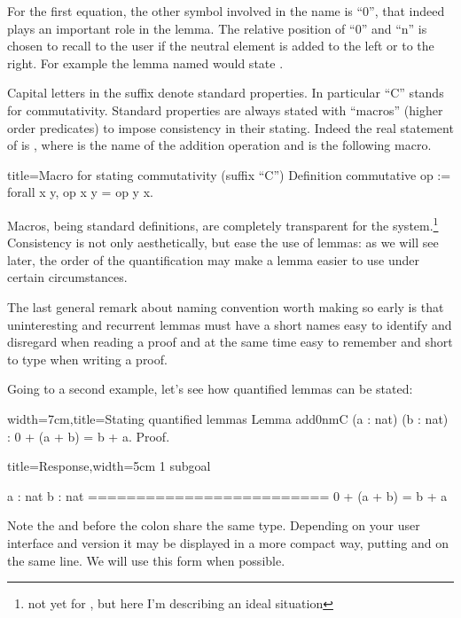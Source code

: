 For the first equation, the other symbol involved in the name is ``0'',
that indeed plays an important role in the lemma.  The relative position
of ``0'' and ``n'' is chosen to recall to the user if the neutral element
is added to the left or to the right.  For example the lemma named
 would state .

Capital letters in the suffix denote standard properties.
In particular ``C'' stands for commutativity.  Standard properties are
always stated with ``macros'' (higher order predicates) to impose
consistency in their stating.  Indeed the real statement of
 is , where  is the
name of the addition operation and  is the
following macro.

\begin{coq}{title=Macro for stating commutativity (suffix ``C'')}
Definition commutative op := forall x y, op x y = op y x.
\end{coq}

Macros, being standard definitions, are completely transparent for the
system.\footnote{not yet for , but here I'm describing an ideal
situation}  Consistency is not only aesthetically, but ease the use of
lemmas: as we will see later, the order of the quantification may make
a lemma easier to use under certain circumstances.

The last general remark about naming convention worth making so early is that
uninteresting and recurrent lemmas must have a short names easy to identify and
disregard when reading a proof and at the same time easy to remember and short
to type when writing a proof.

Going to a second example, let's see how quantified lemmas can be stated:

\begin{coq}{width=7cm,title=Stating quantified lemmas}
Lemma add0nmC (a : nat) (b : nat) :
  0 + (a + b) = b + a.
Proof.
\end{coq}
\begin{coqout}{title=Response,width=5cm}
1 subgoal

 a : nat
 b : nat
 =========================
  0 + (a + b) = b + a
\end{coqout}

Note the  and  before the colon share the same type.
Depending on your user interface and \Coq{} version it may be displayed
in a more compact way, putting   and  on the same line.
We will use this form when possible.

